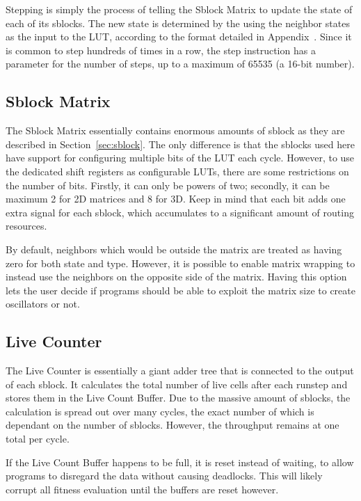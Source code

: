 Stepping is simply the process of telling the Sblock Matrix to update the state of each of its sblocks.
The new state is determined by the using the neighbor states as the input to the LUT, according to the format detailed in Appendix~.
Since it is common to step hundreds of times in a row, the step instruction has a parameter for the number of steps, up to a maximum of 65535 (a 16-bit number).

\subsection{Sblock Matrix}

The Sblock Matrix essentially contains enormous amounts of sblock as they are described in Section~\ref{sec:sblock}.
The only difference is that the sblocks used here have support for configuring multiple bits of the LUT each cycle.
However, to use the dedicated shift registers as configurable LUTs, there are some restrictions on the number of bits.
Firstly, it can only be powers of two; secondly, it can be maximum 2 for 2D matrices and 8 for 3D.
Keep in mind that each bit adds one extra signal for each sblock, which accumulates to a significant amount of routing resources.

By default, neighbors which would be outside the matrix are treated as having zero for both state and type.
However, it is possible to enable matrix wrapping to instead use the neighbors on the opposite side of the matrix.
Having this option lets the user decide if programs should be able to exploit the matrix size to create oscillators or not.

\subsection{Live Counter}

The Live Counter is essentially a giant adder tree that is connected to the output of each sblock.
It calculates the total number of live cells after each runstep and stores them in the Live Count Buffer.
Due to the massive amount of sblocks, the calculation is spread out over many cycles, the exact number of which is dependant on the number of sblocks.
However, the throughput remains at one total per cycle.

If the Live Count Buffer happens to be full, it is reset instead of waiting, to allow programs to disregard the data without causing deadlocks.
This will likely corrupt all fitness evaluation until the buffers are reset however.

